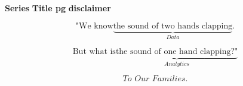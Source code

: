 

\newpage
\thispagestyle{empty}
\textbf{Series}
\newpage
\thispagestyle{empty}
\textbf{Title pg}
\newpage
\thispagestyle{empty}
\textbf{disclaimer}

\newpage
\thispagestyle{empty}
\afterpage{\blankpage}

\hspace{0pt}
\vfill

\begin{equation*}
\text{"We know} \underbrace{\text{the sound of two hands clapping}}_{Data}. 
\end{equation*}

\begin{equation*}
\text{But what is} \underbrace{\text{the sound of one hand clapping?"}}_{ Analytics}
\end{equation*}

\vfill
\hspace{0pt}



\newpage
\thispagestyle{empty}
\afterpage{\blankpage}


\hspace{0pt}
\vfill
\begin{equation*}
\textit{To Our Families}. 
\end{equation*}
\vfill
\hspace{0pt}


{
\setcounter{tocdepth}{1}
\tableofcontents
}

